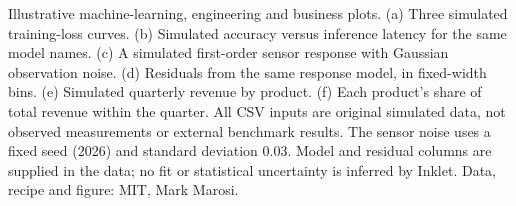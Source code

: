 \caption{Illustrative machine-learning, engineering and business plots. (a) Three simulated training-loss curves. (b) Simulated accuracy versus inference latency for the same model names. (c) A simulated first-order sensor response with Gaussian observation noise. (d) Residuals from the same response model, in fixed-width bins. (e) Simulated quarterly revenue by product. (f) Each product's share of total revenue within the quarter. All CSV inputs are original simulated data, not observed measurements or external benchmark results. The sensor noise uses a fixed seed (2026) and standard deviation 0.03. Model and residual columns are supplied in the data; no fit or statistical uncertainty is inferred by Inklet. Data, recipe and figure: MIT, Mark Marosi.}
